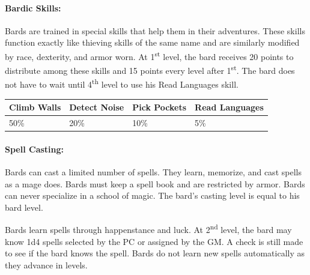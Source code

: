 \begin{multicols}{2}
\paragraph{Bardic Skills:} Bards are trained in special skills that help them in their adventures.  These skills function exactly like thieving skills of the same name and are similarly modified by race, dexterity, and armor worn.  At 1\textsuperscript{st} level, the bard receives 20 points to distribute among these skills and 15 points every level after 1\textsuperscript{st}. The bard does not have to wait until 4\textsuperscript{th} level to use his Read Languages skill.

\noindent
\begin{minipage}{\columnwidth}

\label{bardbase}
\noindent
\begin{tabular}{|m{}|m{}|m{}|m{}|}
\hline
Climb Walls	& Detect Noise	& Pick Pockets	& Read Languages \\
\hline\hline
\rowcolor[gray]{.9}50\%	& 20\%	& 10\%	& 5\% \\
\hline
\end{tabular}

\end{minipage}

\paragraph{Spell Casting:}  Bards can cast a limited number of spells.  They learn, memorize, and cast spells as a mage does.  Bards must keep a spell book and are restricted by armor.  Bards can never specialize in a school of magic.  The bard's casting level is equal to his bard level.

Bards learn spells through happenstance and luck.  At 2\textsuperscript{nd} level, the bard may know 1d4 spells selected by the PC or assigned by the GM.  A check is still made to see if the bard knows the spell.  Bards do not learn new spells automatically as they advance in levels.

\noindent
\begin{minipage}{\columnwidth}


\end{minipage}
\end{multicols}
